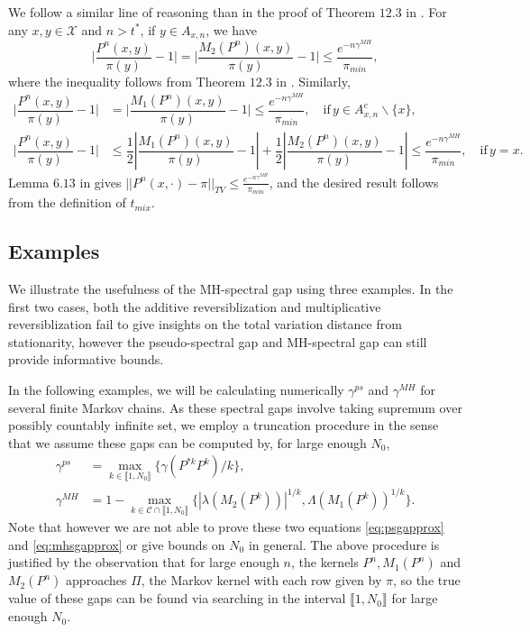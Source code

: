 \documentclass[12pt,a4]{amsart}
\numberwithin{equation}{section}
\theoremstyle{plain}
\theoremstyle{definition}
\theoremstyle{remark}
\let\oldendproof\endproof
\renewenvironment{proof}[1][\proofname]{%
  \oldproof[\noindent\textbf{#1.} ]%
}{\oldendproof}
\newcommand{\1}{\mathds{1}}
\renewcommand{\leq}{\leqslant}
\begin{document}
\begin{proof}[Proof of Corollary \ref{cor:mainresultgeomergod}]
	We follow a similar line of reasoning than in the proof of Theorem $12.3$ in \cite{LPW09}. For any $x,y \in \mathcal{X}$ and $n > t^*$, if $y \in A_{x,n}$, we have
	$$\bigg | \dfrac{P^n(x,y)}{\pi(y)} - 1 \bigg | = \bigg| \dfrac{M_2(P^n)(x,y)}{\pi(y)} - 1 \bigg | \leq \dfrac{e^{-n\gamma^{MH}}}{\pi_{min}},$$
	where the inequality follows from Theorem $12.3$ in \cite{LPW09}. Similarly,
	\begin{align*}
	\bigg | \dfrac{P^n(x,y)}{\pi(y)} - 1 \bigg | &=
	\bigg | \dfrac{M_1(P^n)(x,y)}{\pi(y)} - 1 \bigg | \leq \dfrac{e^{-n\gamma^{MH}}}{\pi_{min}} , \quad \text{if}\, y \in A_{x,n}^c \backslash\{x\},\\
	\bigg | \dfrac{P^n(x,y)}{\pi(y)} - 1 \bigg | &\leq  \dfrac{1}{2}\left | \dfrac{M_1(P^n)(x,y)}{\pi(y)} - 1 \right | + \dfrac{1}{2}\left | \dfrac{M_2(P^n)(x,y)}{\pi(y)} - 1 \right | \leq \dfrac{e^{-n\gamma^{MH}}}{\pi_{min}} , \quad \text{if}\, y = x.
	\end{align*}
	Lemma $6.13$ in \cite{LPW09} gives $||P^n(x,\cdot) - \pi ||_{TV} \leq \frac{e^{-n\gamma^{MH}}}{\pi_{min}}$, and the desired result follows from the definition of $t_{mix}$.
\end{proof}

\subsection{Examples}

We illustrate the usefulness of the MH-spectral gap using three examples. In the first two cases, both the additive reversiblization and multiplicative reversiblization fail to give insights on the total variation distance from stationarity, however the pseudo-spectral gap and MH-spectral gap can still provide informative bounds.

In the following examples, we will be calculating numerically $\gamma^{ps}$ and $\gamma^{MH}$ for several finite Markov chains. As these spectral gaps involve taking supremum over possibly countably infinite set, we employ a truncation procedure in the sense that we assume these gaps can be computed by, for large enough $N_0$,
\begin{align}
	\gamma^{ps} &= \max_{k \in \llbracket 1,N_0 \rrbracket} \{\gamma(P^{*k}P^k)/k\}, \label{eq:psgapprox} \\
	\gamma^{MH} &= 1 - \max_{k \in \mathcal{C} \cap \llbracket 1,N_0 \rrbracket}\{ |\lambda(M_2(P^k))|^{1/k}, \Lambda(M_1(P^k))^{1/k} \}. \label{eq:mhsgapprox}
\end{align}
Note that however we are not able to prove these two equations \eqref{eq:psgapprox} and \eqref{eq:mhsgapprox} or give bounds on $N_0$ in general. The above procedure is justified by the observation that for large enough $n$, the kernels $P^n, M_1(P^n)$ and $M_2(P^n)$ approaches $\Pi$, the Markov kernel with each row given by $\pi$, so the true value of these gaps can be found via searching in the interval $\llbracket 1,N_0 \rrbracket$ for large enough $N_0$.
\end{document}
